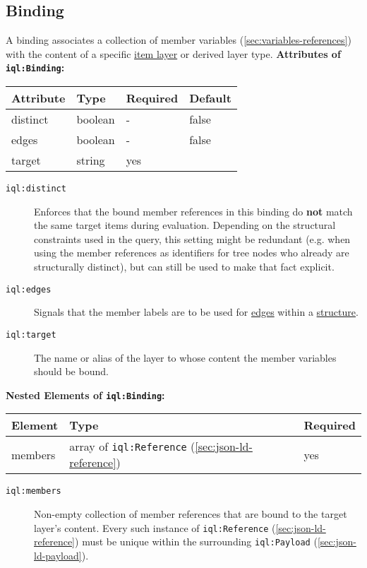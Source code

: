 \documentclass[11pt]{article}
\newcommand{\iqlns}{iql:}
\newcommand{\repo}{https://github.com/ICARUS-tooling/icarus2-modeling-framework/blob/dev/icarus2-model-api/src/main/java/de/ims/icarus2/model/api/}
\newcommand{\repoLink}[2]{\href{\repo#1}{#2}}
\newcommand{\iqlType}[1]{\texttt{\iqlns#1}}
\newcommand{\attributes}[1]{\noindent\textbf{Attributes of \iqlType{#1}:}\newline\medskip}
\newcommand{\elements}[1]{\noindent\textbf{Nested Elements of \iqlType{#1}:}\newline\medskip}
\newcommand{\desc}[1]{\noindent#1\newline\medskip}
\begin{document}
\subsection{Binding}
\label{sec:json-ld-binding}
\desc{A binding associates a collection of member variables (\ref{sec:variables-references}) with the content of a specific \repoLink{layer/ItemLayer.java}{item layer} or derived layer type.}
\attributes{Binding}
\begin{tabular}{|p{}|p{}|p{}|p{}|}
	\hline
	\textbf{Attribute} & \textbf{Type} & \textbf{Required} & \textbf{Default} \\ 
	\hline
	\hline
	distinct & boolean & - & false \\ 
	\hline 
	edges & boolean & - & false \\ 
	\hline 
	target & string & yes & \\ 
	\hline 
\end{tabular}
\begin{description}
	\item[\iqlType{distinct}] Enforces that the bound member references in this binding do \textbf{not} match the same target items during evaluation. Depending on the structural constraints used in the query, this setting might be redundant (e.g. when using the member references as identifiers for tree nodes who already are structurally distinct), but can still be used to make that fact explicit. 
	\item[\iqlType{edges}] Signals that the member labels are to be used for \repoLink{members/item/Edge.java}{edges} within a \repoLink{members/structure/Structure.java}{structure}.
	\item[\iqlType{target}] The name or alias of the layer to whose content the member variables should be bound.
\end{description}
\elements{Binding}
\begin{tabular}{|p{}|p{}|p{}|}
	\hline
	\textbf{Element} & \textbf{Type} & \textbf{Required} \\ 
	\hline
	\hline 
	members & array of \iqlType{Reference} (\ref{sec:json-ld-reference}) & yes \\ 
	\hline 
\end{tabular}
\begin{description}
	\item[\iqlType{members}] Non-empty collection of member references that are bound to the target layer's content. Every such instance of \iqlType{Reference} (\ref{sec:json-ld-reference}) must be unique within the surrounding \iqlType{Payload} (\ref{sec:json-ld-payload}).
\end{description}
\end{document}
